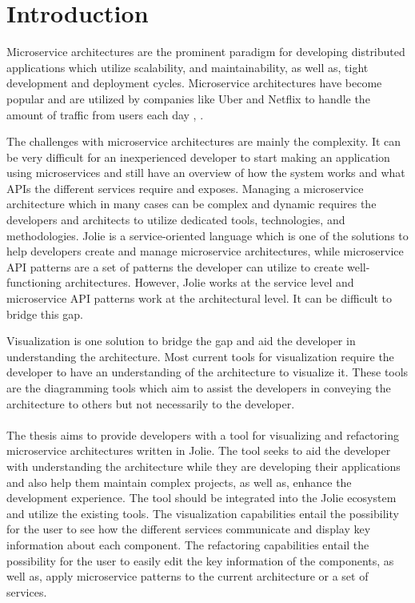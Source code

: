 \chapter{Introduction}
Microservice architectures are the prominent paradigm for developing distributed applications which utilize scalability, and maintainability, as well as, tight development and deployment cycles.
Microservice architectures have become popular and are utilized by companies like Uber and Netflix
to handle the amount of traffic from users each day \cite{netflix}, \cite{uber}.

The challenges with microservice architectures are mainly the complexity. It can be very difficult for an inexperienced developer to start making an application using microservices and still have an overview of how the system works and what APIs the different services require and exposes.
Managing a microservice architecture which in many cases can be complex and dynamic requires the developers and architects to utilize dedicated tools, technologies, and methodologies.
Jolie \cite{jolie} is a service-oriented language which is one of the solutions to help developers create and manage microservice architectures, while microservice API patterns \cite{PatternsForAPIDesign:2022} are a set of patterns the developer can utilize to create well-functioning architectures.
However, Jolie works at the service level and microservice API patterns work at the architectural level. It can be difficult to bridge this gap.

Visualization is one solution to bridge the gap and aid the developer in understanding the architecture.
Most current tools for visualization require the developer to have an understanding of the architecture to visualize it.
These tools are the diagramming tools which aim to assist the developers in conveying the architecture to others but not necessarily to the developer.
\\
\\
The thesis aims to provide developers with a tool for visualizing and refactoring microservice architectures written in Jolie. The tool seeks to aid the developer with understanding the architecture while they are developing their applications and also 
help them maintain complex projects, as well as, enhance the development experience.
The tool should be integrated into the Jolie ecosystem and utilize the existing tools.
The visualization capabilities entail the possibility for the user to see how the different services communicate and display key information about each component.
The refactoring capabilities entail the possibility for the user to easily edit the key information of the components, as well as, apply microservice patterns to the current architecture or a set of services.

